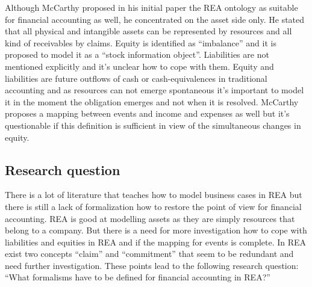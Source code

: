 Although McCarthy proposed in his initial paper \cite{mccarthy1982rea} the REA ontology as suitable for financial accounting as well, he concentrated on the asset side only.
He stated that all physical and intangible assets can be represented by resources and all kind of receivables by claims.
Equity is identified as ``imbalance'' and it is proposed to model it as a ``stock information object''.
Liabilities are not mentioned explicitly and it's unclear how to cope with them.
Equity and liabilities are future outflows of cash or cash-equivalences in traditional accounting and as resources can not emerge spontaneous it's important to model it in the moment the obligation emerges and not when it is resolved.
McCarthy proposes a mapping between events and income and expenses as well but it's questionable if this definition is sufficient in view of the simultaneous changes in equity.

\subsection*{Research question}

There is a lot of literature that teaches how to model business cases in REA but there is still a lack of formalization how to restore the point of view for financial accounting.
REA is good at modelling assets as they are simply resources that belong to a company.
But there is a need for more investigation how to cope with liabilities and equities in REA and if the mapping for events is complete.
In REA exist two concepts ``claim'' and ``commitment'' that seem to be redundant and need further investigation.
These points lead to the following research question: ``What formalisms have to be defined for financial accounting in REA?''




